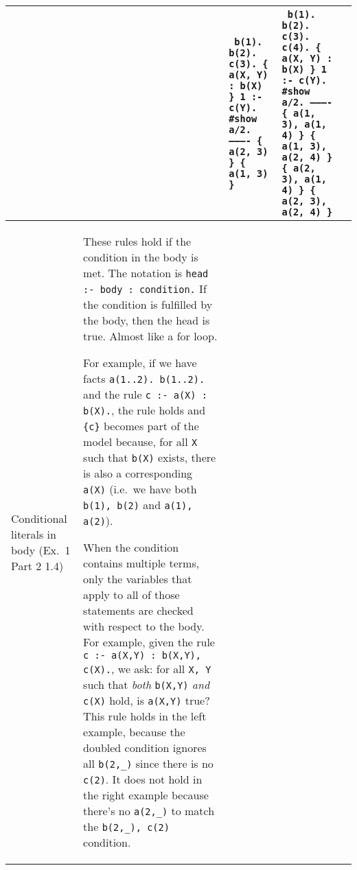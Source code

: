 \documentclass[10pt,a4paper,landscape]{article}
\begin{document}
\begin{longtable}{Lp{13.5cm}lXX}
		&& {\tiny\texttt{%
			b(1). b(2). c(3).  \{ a(X, Y) : b(X) \} 1 :- c(Y).\newline
			\#show a/2.\newline
			---------- \newline
			\{ a(2, 3) \} \newline
			\{ a(1, 3) \} \newline
		}} &
		{\tiny\texttt{%
				b(1). b(2). c(3). c(4).  \{ a(X, Y) : b(X) \} 1 :- c(Y).\newline
				\#show a/2.\newline
				---------- \newline
				\{ a(1, 3), a(1, 4) \} \newline
				\{ a(1, 3), a(2, 4) \} \newline
				\{ a(2, 3), a(1, 4) \} \newline
				\{ a(2, 3), a(2, 4) \} \newline
		}}
		\\ \midrule
		
	Conditional literals in body \newline (Ex.\ 1 Part 2 1.4)
		& These rules hold if the condition in the body is met.
		The notation is \texttt{head :- body : condition.} 
		If the condition is fulfilled by the body, then the head is true. 
		Almost like a for loop. \newline
		
		For example, if we have facts \texttt{a(1..2). b(1..2).} and the rule \texttt{c :- a(X) : b(X).}, the rule holds and \texttt{\{c\}} becomes part of the model because, for all \texttt{X} such that \texttt{b(X)} exists, there is also a corresponding \texttt{a(X)} (i.e.\ we have both \texttt{b(1), b(2)} and \texttt{a(1), a(2)}). \newline
		
		When the condition contains multiple terms, only the variables that apply to all of those statements are checked with respect to the body.
		For example, given the rule \texttt{c :- a(X,Y) : b(X,Y), c(X).}, we ask: for all \texttt{X, Y} such that \textit{both} \texttt{b(X,Y)} \textit{and} \texttt{c(X)} hold, is \texttt{a(X,Y)} true? 
		This rule holds in the left example, because the doubled condition ignores all \texttt{b(2,\_)} since there is no \texttt{c(2)}.
		It does not hold in the right example because there's no \texttt{a(2,\_)} to match the \texttt{b(2,\_), c(2)} condition. \newline
		

\end{longtable}
\end{document}
